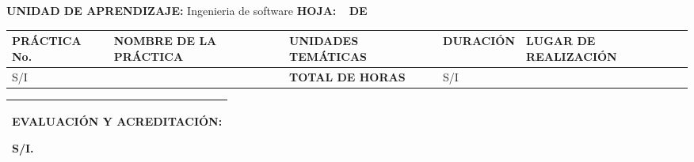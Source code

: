 \documentclass[10pt]{article}
\newcommand\tab[1][1cm]{\hspace*{#1}}
\begin{document}
\textbf{UNIDAD DE APRENDIZAJE:} Ingenieria de software
\tab[1cm]
\textbf{HOJA: } \thepage\
\tab[0.25cm]
\textbf{DE } \pageref{LastPage}\\
\begin{center}
\end{center}
\begin{table}[H]
  \begin{tabular}{|p{}|p{}|p{}|p{}|p{}|}
    \hline
    \Centering\textbf{PRÁCTICA No.} & \Centering\textbf{NOMBRE DE LA PRÁCTICA} & \Centering\textbf{UNIDADES TEMÁTICAS} & \Centering\textbf{DURACIÓN} & \Centering\textbf{LUGAR DE REALIZACIÓN}\\
    \hline 
    S/I
    \hline &&\Centering\textbf{TOTAL DE HORAS}& S/I &\\\hline 
  \end{tabular}
  \begin{tabular}{|p{1.045\textwidth}|}
    \textbf{EVALUACIÓN Y ACREDITACIÓN:}

    S/I.\\\hline
  \end{tabular}
\end{table}


\end{document}
